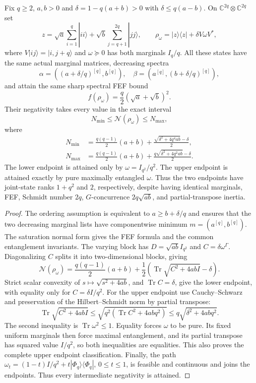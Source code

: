 \begin{theorem}\label{thm:balanced-negativity}
Fix $q\ge2$, $a,b>0$ and
$\delta=1-q(a+b)>0$ with $\delta\le q(a-b)$.
On $\mathbb C^{2q}\otimes\mathbb C^{2q}$ set
\[
 z=\sqrt a\sum_{i=1}^q|ii\rangle+
   \sqrt b\sum_{j=q+1}^{2q}|jj\rangle,
 \qquad \rho_\omega=|z\rangle\langle z|+\delta V\omega V^*,
\]
where $V|ij\rangle=|i,j+q\rangle$ and
$\omega\succeq0$ has both marginals $I_q/q$.
All these states have the same actual marginal matrices, decreasing spectra
\[
 \alpha=((a+\delta/q)^{[q]},b^{[q]}),\quad
 \beta=(a^{[q]},(b+\delta/q)^{[q]}),
\]
and attain the same sharp spectral FEF bound
\[
 f(\rho_\omega)=\frac q2(\sqrt a+\sqrt b)^2.
\]
Their negativity takes every value in the exact interval
\[
 \boxed{\quad N_{\min}\le\mathcal N(\rho_\omega)\le N_{\max},\quad}
\]
where
\begin{align*}
 N_{\min}&=\frac{q(q-1)}2(a+b)
          +\frac{\sqrt{\delta^2+4q^4ab}-\delta}{2},\\
 N_{\max}&=\frac{q(q-1)}2(a+b)
          +\frac{q\sqrt{\delta^2+4q^2ab}-\delta}{2}.
\end{align*}
The lower endpoint is attained only by $\omega=I_{q^2}/q^2$.
The upper endpoint is attained exactly by pure maximally entangled
$\omega$. Thus the two endpoints have joint-state ranks $1+q^2$ and $2$,
respectively, despite having identical marginals, FEF, Schmidt number
$2q$, $G$-concurrence $2q\sqrt{ab}$, and partial-transpose inertia.
\end{theorem}
\begin{proof}
The ordering assumption is equivalent to $a\ge b+\delta/q$ and ensures
that the two decreasing marginal lists have componentwise minimum
$m=(a^{[q]},b^{[q]})$. The saturation normal form gives the FEF formula
and the common entanglement invariants. The varying block has
$D=\sqrt{ab}I_{q^2}$ and $C=\delta\omega^\Gamma$.
Diagonalizing $C$ splits it into two-dimensional blocks, giving
\[
 \mathcal N(\rho_\omega)=\frac{q(q-1)}2(a+b)
   +\frac12\left(\operatorname{Tr}\sqrt{C^2+4abI}-\delta\right).
\]
Strict scalar convexity of $s\mapsto\sqrt{s^2+4ab}$, and
$\operatorname{Tr}C=\delta$, give the lower endpoint, with equality only
for $C=\delta I/q^2$.
For the upper endpoint use Cauchy--Schwarz and preservation of the
Hilbert--Schmidt norm by partial transpose:
\[
 \operatorname{Tr}\sqrt{C^2+4abI}
 \le \sqrt{q^2(\operatorname{Tr}C^2+4abq^2)}
 \le q\sqrt{\delta^2+4abq^2}.
\]
The second inequality is $\operatorname{Tr}\omega^2\le1$. Equality forces
$\omega$ to be pure. Its fixed uniform marginals then force maximal
entanglement, and its partial transpose has squared value $I/q^2$, so
both inequalities are equalities. This also proves the complete upper
endpoint classification. Finally, the path
$\omega_t=(1-t)I/q^2+t|\Phi_q\rangle\langle\Phi_q|$, $0\le t\le1$,
is feasible and continuous and joins the endpoints. Thus every
intermediate negativity is attained.
\end{proof}

